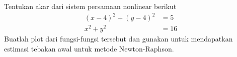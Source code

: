 \begin{soal}
Tentukan akar dari sistem persamaan nonlinear berikut
\begin{align*}
(x - 4)^2 + (y - 4)^2 & = 5 \\
x^2 + y^2 & = 16
\end{align*}
Buatlah plot dari fungsi-fungsi tersebut dan gunakan untuk mendapatkan estimasi tebakan
awal untuk metode Newton-Raphson.
\end{soal}

